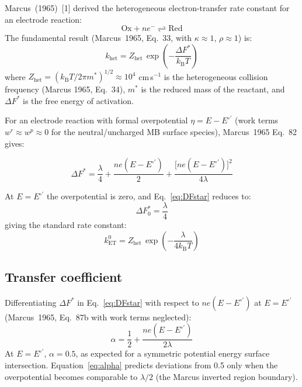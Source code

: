 \documentclass[10pt,a4paper]{article}
\numberwithin{equation}{section}
\newcommand{\kET}{k_{\text{ET}}^{0}}
\newcommand{\cit}[1]{[#1]}
\newcommand{\Eo}{E^{\circ\prime}}
\newcommand{\kB}{k_{\text{B}}}
\begin{document}
Marcus~(1965)~\cit{1} derived the heterogeneous electron-transfer
rate constant for an electrode reaction:
\begin{equation}
  \text{Ox} + ne^{-} \rightleftharpoons \text{Red}
  \label{eq:rxn}
\end{equation}
The fundamental result (Marcus~1965, Eq.~33, with $\kappa \approx 1$,
$\rho \approx 1$) is:
\begin{equation}
  k_{\text{het}} = Z_{\text{het}}\,\exp\!\left(-\frac{\Delta F^*}{\kB T}\right)
  \label{eq:marcusrate}
\end{equation}
where $Z_{\text{het}} = ({\kB T}/{2\pi m^*})^{1/2} \approx 10^4$
cm\,s$^{-1}$ is the heterogeneous collision frequency (Marcus 1965,
Eq.~34), $m^*$ is the reduced mass of the reactant, and
$\Delta F^*$ is the free energy of activation.

For an electrode reaction with formal overpotential
$\eta = E - \Eo$ (work terms $w^r \approx w^p \approx 0$ for the
neutral/uncharged MB surface species), Marcus~1965 Eq.~82 gives:

\begin{equation}
  \Delta F^* = \frac{\lambda}{4}
  + \frac{ne(E - \Eo)}{2}
  + \frac{\bigl[ne(E - \Eo)\bigr]^2}{4\lambda}
  \label{eq:DFstar}
\end{equation}

At $E = \Eo$ the overpotential is zero, and Eq.~\eqref{eq:DFstar}
reduces to:
\begin{equation}
  \Delta F^*_0 = \frac{\lambda}{4}
  \label{eq:DFzero}
\end{equation}
giving the standard rate constant:
\begin{equation}
  \kET = Z_{\text{het}}\,\exp\!\left(-\frac{\lambda}{4\kB T}\right)
  \label{eq:kET0}
\end{equation}

\subsection{Transfer coefficient}

Differentiating $\Delta F^*$ in Eq.~\eqref{eq:DFstar} with respect
to $ne(E - \Eo)$ at $E = \Eo$ (Marcus~1965, Eq.~87b with work terms
neglected):
\begin{equation}
  \alpha = \frac{1}{2} + \frac{ne(E - \Eo)}{2\lambda}
  \label{eq:alpha}
\end{equation}
At $E = \Eo$, $\alpha = 0.5$, as expected for a symmetric potential
energy surface intersection. Equation~\eqref{eq:alpha} predicts
deviations from 0.5 only when the overpotential becomes comparable to
$\lambda/2$ (the Marcus inverted region boundary).
\end{document}
